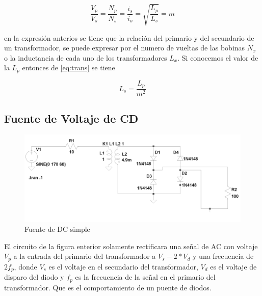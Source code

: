 \documentclass{article}
\begin{document}
\begin{equation}\label{eq:trans}
\frac{V_{p}}{V_{s}}=\frac{N_{p}}{N_{s}}=\frac{i_{s}}{i_{o}}=\sqrt{\frac{L_{p}}{L_{s}}}=m
\end{equation}

en la expresión anterios se tiene que la relación del primario y del
secundario de un transformador, se puede expresar por el numero de
vueltas de las bobinas $N_{x}$ o la inductancia de cada uno de los
transformadores $L_{x}$. Si conocemos el valor de la $L_{p}$ entonces de
\eqref{eq:trans} se tiene

\begin{equation}
L_{s}=\frac{L_{p}}{m^{2}}
\end{equation}

    \subsection{Fuente de Voltaje de CD}\label{fuente-de-voltaje-de-cd}

\begin{figure}[htbp]
\centering
\includegraphics{images/fuentesimplesinfiltro.png}
\caption{Fuente de DC simple}
\end{figure}

El circuito de la figura enterior solamente rectificara una señal de AC
con voltaje $V_{p}$ a la entrada del primario del transformador a
$V_{s}-2*V_{d}$ y una frecuencia de $2f_{p}$, donde $V_{s}$ es el
voltaje en el secundario del transformador, $V_{d}$ es el voltaje de
disparo del diodo y $f_{p}$ es la frecuencia de la señal en el primario
del transformador. Que es el comportamiento de un puente de diodos.


    \begin{center}
    \end{center}
    { \hspace*{\fill} \\}
    
\end{document}
